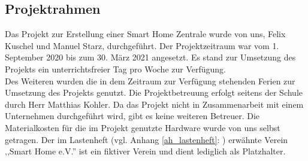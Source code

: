 \subsection{Projektrahmen}\label{vw_projektrahmen}
Das Projekt zur Erstellung einer Smart Home Zentrale wurde von uns, Felix Kuschel und Manuel Starz, durchgeführt. 
Der Projektzeitraum war vom 1. September 2020 bis zum 30. März 2021 angesetzt. 
Es stand zur Umsetzung des Projekts ein unterrichtsfreier Tag pro Woche zur Verfügung.\\
\noindent Des Weiteren wurden die in dem Zeitraum zur Verfügung stehenden Ferien zur Umsetzung des Projekts genutzt. Die Projektbetreuung erfolgt seitens der Schule durch Herr Matthias Kohler. 
Da das Projekt nicht in Zusammenarbeit mit einem Unternehmen durchgeführt wird, gibt es keine weiteren Betreuer. 
Die Materialkosten für die im Projekt genutzte Hardware wurde von uns selbst getragen.
Der im Lastenheft (vgl. Anhang \ref{ah_lastenheft}: ) erwähnte Verein ,,Smart Home e.V.'' ist ein fiktiver Verein und dient lediglich als Platzhalter.